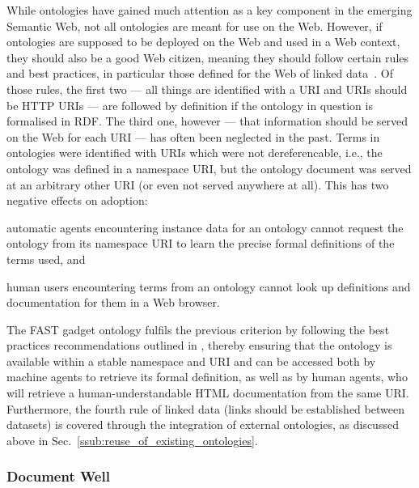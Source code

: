 \documentclass[twoside]{fast_latex}
\begin{document}
While ontologies have gained much attention as a key component in the emerging Semantic Web, not all ontologies are meant for use on the Web. However, if ontologies are supposed to be deployed on the Web and used in a Web context, they should also be a good Web citizen, meaning they should follow certain rules and best practices, in particular those defined for the Web of linked data~\cite{bernersLee2006linkedData}. Of those rules, the first two --- all things are identified with a URI and URIs should be HTTP URIs --- are followed by definition if the ontology in question is formalised in RDF. The third one, however --- that information should be served on the Web for each URI --- has often been neglected in the past. Terms in ontologies were identified with URIs which were not dereferencable, i.e., the ontology was defined in a namespace URI, but the ontology document was served at an arbitrary other URI (or even not served anywhere at all). This has two negative effects on adoption:
\begin{inparaenum}[(i)]
	\item automatic agents encountering instance data for an ontology cannot request the ontology from its namespace URI to learn the precise formal definitions of the terms used, and
	\item human users encountering terms from an ontology cannot look up definitions and documentation for them in a Web browser. 
\end{inparaenum}

The FAST gadget ontology fulfils the previous criterion by following the best practices recommendations outlined in \cite{berrueta2008publishing_rdf_vocabularies}, thereby ensuring that the ontology is available within a stable namespace and URI and can be accessed both by machine agents to retrieve its formal definition, as well as by human agents, who will retrieve a human-understandable HTML documentation from the same URI. Furthermore, the fourth rule of linked data (links should be established between datasets) is covered through the integration of external ontologies, as discussed above in Sec.~\ref{ssub:reuse_of_existing_ontologies}.


\subsubsection{Document Well} %
\label{ssub:be_well_documented}
\end{document}
